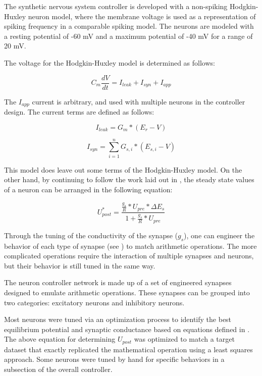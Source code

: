 The synthetic nervous system controller is developed with a non-spiking Hodgkin-Huxley neuron model, where the membrane voltage is used as a representation of spiking frequency in a comparable spiking model. The neurons are modeled with a resting potential of -60 mV and a maximum potential of -40 mV for a range of 20 mV.

The voltage for the Hodgkin-Huxley model is determined as follows:

\begin{equation}
C_{m} \dfrac{d V}{d t} = I_{leak} + I_{syn} + I_{app}
\end{equation}

The $I_{app}$ current is arbitrary, and used with multiple neurons in the controller design.
The current terms are defined as follows:

\begin{equation}
I_{leak} = G_{m} * (E_{r} - V)
\end{equation}

\begin{equation}
I_{syn} = \sum_{i=1}^{n} G_{s, i} * (E_{s, i} - V)
\end{equation}

This model does leave out some terms of the Hodgkin-Huxley model. On the other hand, by continuing to follow the work laid out in \cite{NickFunctionalSubnetwork}, the steady state values of a neuron can be arranged in the following equation:

\begin{equation}
U_{post}^{*} = \dfrac{\frac{g_{s}}{R} * U_{pre} * \Delta E_{s}}{1 + \frac{g_{s}}{R} * U_{pre}}
\end{equation}

Through the tuning of the conductivity of the synapse ($g_{s}$), one can engineer the behavior of each type of synapse (see ) to match arithmetic operations. The more complicated operations require the interaction of multiple synapses and neurons, but their behavior is still tuned in the same way.


\label{sec:key_synapses}

The neuron controller network is made up of a set of engineered synapses
designed to emulate arithmetic operations. These synapses can be grouped into two
categories: excitatory neurons and inhibitory neurons. 

Most neurons were tuned
via an optimization process to identify the best equilibrium potential and
synaptic conductance based on equations defined in 
\cite{NickFunctionalSubnetwork}. The above equation for determining $U_{post}$ was optimized to match a target dataset that exactly replicated the mathematical operation using a least squares approach.
Some neurons were tuned by hand for specific behaviors in
a subsection of the overall controller.

